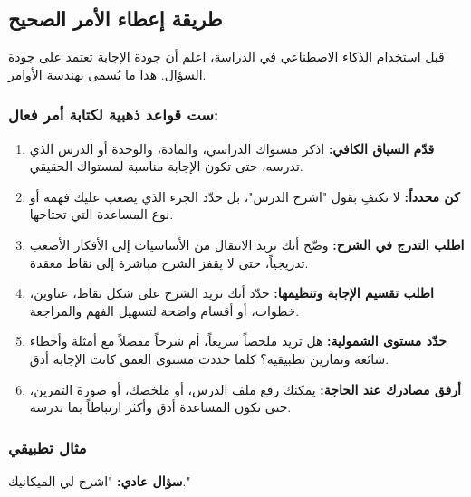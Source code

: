 \documentclass[12pt,a4paper]{book}
\begin{document}
\subsection{طريقة إعطاء الأمر الصحيح}

قبل استخدام الذكاء الاصطناعي في الدراسة، اعلم أن جودة الإجابة تعتمد على جودة السؤال. هذا ما يُسمى بهندسة الأوامر.

\subsubsection{ست قواعد ذهبية لكتابة أمر فعال:}

\begin{enumerate}
	\item \textbf{قدّم السياق الكافي:} اذكر مستواك الدراسي، والمادة، والوحدة أو الدرس الذي تدرسه، حتى تكون الإجابة مناسبة لمستواك الحقيقي.
	
	\item \textbf{كن محدداً:} لا تكتفِ بقول "اشرح الدرس"، بل حدّد الجزء الذي يصعب عليك فهمه أو نوع المساعدة التي تحتاجها.
	
	\item \textbf{اطلب التدرج في الشرح:} وضّح أنك تريد الانتقال من الأساسيات إلى الأفكار الأصعب تدريجياً، حتى لا يقفز الشرح مباشرة إلى نقاط معقدة.
	
	\item \textbf{اطلب تقسيم الإجابة وتنظيمها:} حدّد أنك تريد الشرح على شكل نقاط، عناوين، خطوات، أو أقسام واضحة لتسهيل الفهم والمراجعة.
	
	\item \textbf{حدّد مستوى الشمولية:} هل تريد ملخصاً سريعاً، أم شرحاً مفصلاً مع أمثلة وأخطاء شائعة وتمارين تطبيقية؟ كلما حددت مستوى العمق كانت الإجابة أدق.
	
	\item \textbf{أرفق مصادرك عند الحاجة:} يمكنك رفع ملف الدرس، أو ملخصك، أو صورة التمرين، حتى تكون المساعدة أدق وأكثر ارتباطاً بما تدرسه.
\end{enumerate}

\subsubsection{مثال تطبيقي}

\textbf{سؤال عادي:} "اشرح لي الميكانيك."
\end{document}
